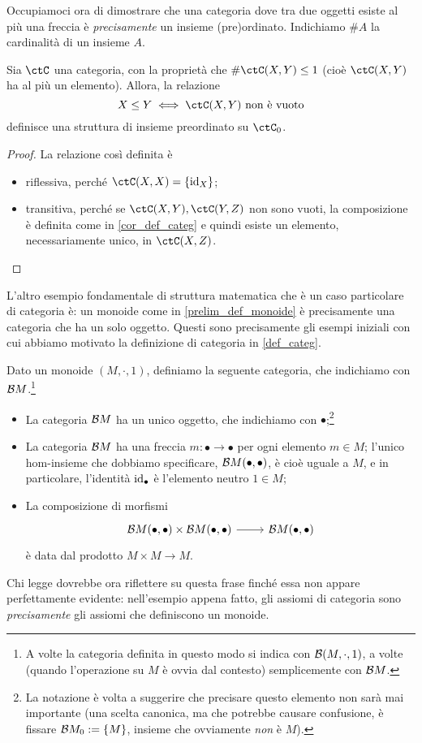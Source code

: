 Occupiamoci ora di dimostrare che una categoria dove tra due oggetti esiste al più una freccia è \emph{precisamente} un insieme (pre)ordinato. Indichiamo \(\# A\) la cardinalità di un insieme \(A\).
\begin{theorem}\label{cat_sonopos}
	Sia \(\ctC\) una categoria, con la proprietà che \(\#\Hom{\ctC}(X,Y) \le 1\) (cioè \(\Hom{\ctC}(X,Y)\) ha al più un elemento). Allora, la relazione
	\[X\le Y \iff \Hom{\ctC}(X,Y) \text{ non è vuoto}\]
	definisce una struttura di insieme preordinato su \(\ctC_0\).
\end{theorem}
\begin{proof}
	La relazione così definita è
	\begin{itemize}
		\item riflessiva, perché \(\Hom{\ctC}(X,X) = \{\id_X\}\);
		\item transitiva, perché se \(\Hom{\ctC}(X,Y), \Hom{\ctC}(Y,Z)\) non sono vuoti, la composizione è definita come in \ref{cor_def_categ} e quindi esiste un elemento, necessariamente unico, in \(\Hom{\ctC}(X,Z)\).\qedhere
	\end{itemize}
\end{proof}
L'altro esempio fondamentale di struttura matematica che è un caso particolare di categoria è: un monoide come in \ref{prelim_def_monoide} è precisamente una categoria che ha un solo oggetto. Questi sono precisamente gli esempi iniziali con cui abbiamo motivato la definizione di categoria in \ref{def_categ}.
\begin{theorem}\label{mon_sonocat}
	Dato un monoide \((M,\cdot,1)\), definiamo la seguente categoria, che indichiamo con \(\mathcal{B} M\).\footnote{A volte la categoria definita in questo modo si indica con \(\mathcal{B}(M,\cdot,1)\), a volte (quando l'operazione su \(M\) è ovvia dal contesto) semplicemente con \(\mathcal{B} M\).}
	\begin{itemize}
		\item La categoria \(\mathcal{B} M\) ha un unico oggetto, che indichiamo con \(\bullet\);\footnote{La notazione è volta a suggerire che precisare questo elemento non sarà mai importante (una scelta canonica, ma che potrebbe causare confusione, è fissare \(\mathcal{B} M_0 := \{M\}\), insieme che ovviamente \emph{non} è \(M\)).}
		\item La categoria \(\mathcal{B} M\) ha una freccia \(m:\bullet\to\bullet\) per ogni elemento \(m\in M\); l'unico hom-insieme che dobbiamo specificare, \(\mathcal{B} M(\bullet,\bullet)\), è cioè uguale a \(M\), e in particolare, l'identità \(\mathrm{id}_\bullet\) è l'elemento neutro \(1\in M\);
		\item La composizione di morfismi
		      \[\longmor{\Hom{\susp M}(\bullet,\bullet)\times \Hom{\susp M}(\bullet,\bullet)}{\Hom{\susp M}(\bullet,\bullet)}\]
		      è data dal prodotto \(M\times M\to M\).
	\end{itemize}
\end{theorem}
Chi legge dovrebbe ora riflettere su questa frase finché essa non appare perfettamente evidente: nell'esempio appena fatto, gli assiomi di categoria sono \emph{precisamente} gli assiomi che definiscono un monoide.

